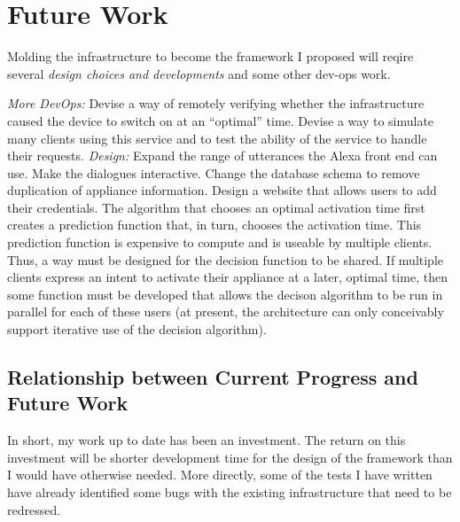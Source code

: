 \documentclass[a4paper]{article}
\begin{document}
\section{Future Work}
Molding the infrastructure to become the framework I proposed will reqire several \textit{design choices and developments} and some other dev-ops work.
\begin{outline}
    \1 \textit{More DevOps:}
    \2  Devise a way of remotely 
    verifying whether the infrastructure caused the device to switch on at an ``optimal'' time.
    \2  Devise a way to simulate many clients using this service and to test the ability of the service to handle their requests.
    \1 \textit{Design:}
    \1  Expand the range of utterances the Alexa front end can use.
    \1  Make the dialogues interactive.
    \1  Change the database schema to remove duplication of appliance information.
    \1 Design a website that allows users to add their credentials.
    \1 The algorithm that chooses an optimal activation time first creates a prediction function that, in turn, chooses the activation time. This prediction function is expensive to compute and is useable by multiple clients. Thus, a way must be designed for the decision function to be shared.
    \1 If multiple clients express an intent to activate their appliance at a later, optimal time, then some function must be developed that allows the decison algorithm to be run in parallel for each of these users (at present, the architecture can only conceivably support iterative use of the decision algorithm).
    \end{outline}
\subsection{Relationship between Current Progress and Future Work}
In short, my work up to date has been an investment. The return on this investment will be shorter development time for the design of the framework than I would have otherwise needed. More directly, some of the tests I have written have already identified some bugs with the existing infrastructure that need to be redressed.
\end{document}
